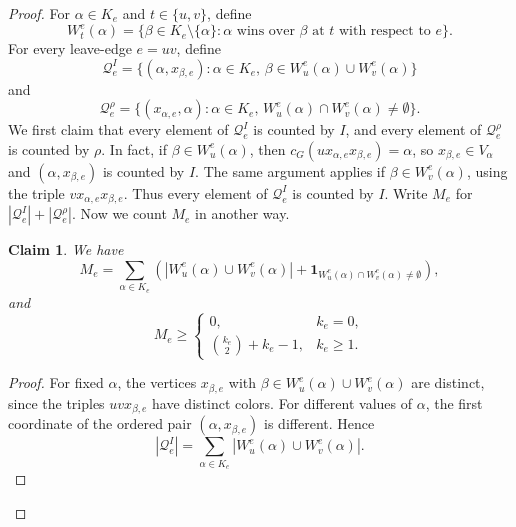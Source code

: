 \documentclass[10pt,a4paper]{amsart}
\newtheorem{claim}{Claim}
\begin{document}
\begin{proof}
    For $\alpha\in K_e$ and $t\in\{u,v\}$, define
    \[
        W_t^e(\alpha)
        =
        \{\beta\in K_e\setminus\{\alpha\}:
        \alpha \text{ wins over } \beta \text{ at } t \text{ with respect to } e\}.
    \]
    For every leave-edge $e=uv$, define
    \[
        \mathcal Q_e^I
        =
        \{(\alpha,x_{\beta,e}):
        \alpha\in K_e,\,
        \beta\in W_u^e(\alpha)\cup W_v^e(\alpha)\}
    \]
    and
    \[
        \mathcal Q_e^\rho
        =
        \{(x_{\alpha,e},\alpha):
        \alpha\in K_e,\,
        W_u^e(\alpha)\cap W_v^e(\alpha)\neq\emptyset\}.
    \]
    We first claim that every element of $\mathcal Q_e^I$ is counted by $I$, and every element of $\mathcal Q_e^\rho$ is counted by $\rho$.
    In fact, if $\beta\in W_u^e(\alpha)$, then $c_G(ux_{\alpha,e}x_{\beta,e})=\alpha$, so $x_{\beta,e}\in V_\alpha$ and $(\alpha,x_{\beta,e})$ is counted by $I$.
    The same argument applies if $\beta\in W_v^e(\alpha)$, using
    the triple $vx_{\alpha,e}x_{\beta,e}$.  Thus every element of
    $\mathcal Q_e^I$ is counted by $I$.
    Write $M_e$ for $|\mathcal Q_e^I|+|\mathcal Q_e^\rho|$.
    Now we count $M_e$ in another way.
    \begin{claim}\label{clm:bad-winner-contribution-new}
        We have
        \begin{equation}\label{eq:Me-def}
            M_e=
            \sum_{\alpha\in K_e}
            \left(
            |W_u^e(\alpha)\cup W_v^e(\alpha)|
            +
            \mathbf 1_{W_u^e(\alpha)\cap W_v^e(\alpha)\neq\emptyset}
            \right),
        \end{equation}
        and
        \begin{equation}\label{eq:Me-lower}
            M_e\ge
            \begin{cases}
                0,                    & k_e=0,   \\
                \binom{k_e}{2}+k_e-1, & k_e\ge1.
            \end{cases}
        \end{equation}
    \end{claim}
    \begin{proof}
        For fixed $\alpha$, the vertices $x_{\beta,e}$ with
        $\beta\in W_u^e(\alpha)\cup W_v^e(\alpha)$ are distinct, since the
        triples $uvx_{\beta,e}$ have distinct colors.  For different values
        of $\alpha$, the first coordinate of the ordered pair
        $(\alpha,x_{\beta,e})$ is different.  Hence
        \[
            |\mathcal Q_e^I|
            =
            \sum_{\alpha\in K_e}|W_u^e(\alpha)\cup W_v^e(\alpha)|.
        \]


\end{proof}
\end{proof}
\end{document}
